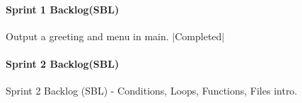 \paragraph*{Sprint 1 Backlog(\+S\+B\+L)}


\begin{DoxyEnumerate}
\item Output a greeting and menu in main. $\vert$\+Completed$\vert$
\end{DoxyEnumerate}

\paragraph*{Sprint 2 Backlog(\+S\+B\+L)}

Sprint 2 Backlog (S\+BL) -\/ Conditions, Loops, Functions, Files intro.


